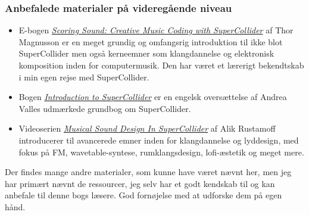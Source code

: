 \subsubsection{Anbefalede materialer på videregående niveau}

\begin{itemize}
\item E-bogen \href{https://leanpub.com/ScoringSound}{\textit{Scoring Sound: Creative Music Coding with SuperCollider}} af Thor Magnusson \parencite*{magnusson2021} er en meget grundig og omfangsrig introduktion til ikke blot SuperCollider men også kerneemner som klangdannelse og elektronisk komposition inden for computermusik. Den har været et lærerigt bekendtskab i min egen rejse med SuperCollider.
\item Bogen \href{https://www.logos-verlag.de/cgi-bin/engbuchmid?isbn=4017\&lng=eng\&id=}{\textit{Introduction to SuperCollider}} er en engelsk oversættelse af Andrea Valles \parencite*{valle2016} udmærkede grundbog om SuperCollider.
\item Videoserien \href{https://www.youtube.com/playlist?list=PLXCUkMwOEWQtB-leHHSexTizzcACdozp9}{\textit{Musical Sound Design In SuperCollider}} af Alik Rustamoff \parencite*{rustamoff2022} introducerer til avancerede emner inden for klangdannelse og lyddesign, med fokus på FM, wavetable-syntese, rumklangsdesign, lofi-æstetik og meget mere. 
\end{itemize}

Der findes mange andre materialer, som kunne have været nævnt her, men jeg har primært nævnt de ressourcer, jeg selv har et godt kendskab til og kan anbefale til denne bogs læsere. God fornøjelse med at udforske dem på egen hånd.
